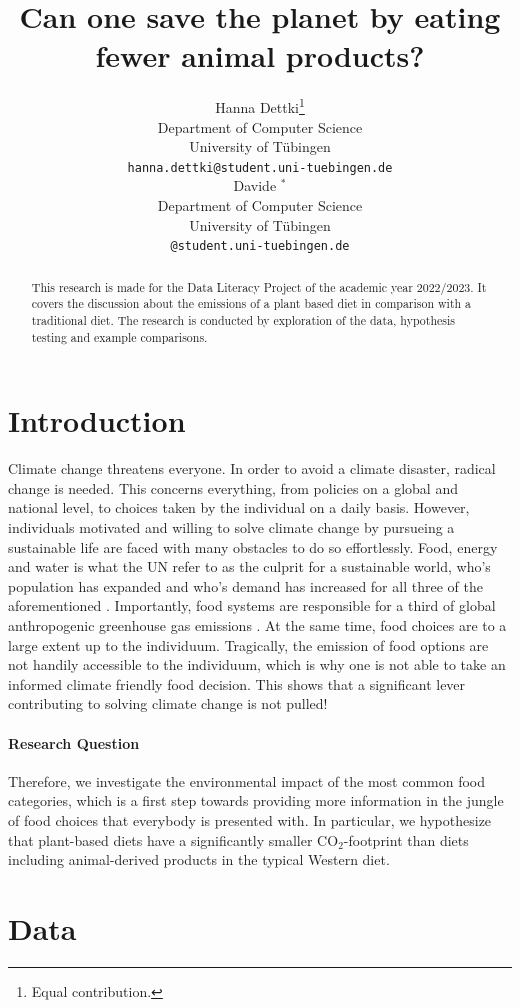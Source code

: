 \documentclass{article}
\title{Can one save the planet by eating fewer animal products?}
\author{%
  Hanna Dettki\thanks{Equal contribution.} \\
  Department of Computer Science\\
  University of Tübingen\\
  \texttt{hanna.dettki@student.uni-tuebingen.de} \\
  \And
  Davide $^{*}$  \\
  Department of Computer Science\\
  University of Tübingen\\
  \texttt{@student.uni-tuebingen.de} \\
}
\begin{document}
\maketitle

\begin{abstract}
  This research is made for the Data Literacy Project of the academic year 2022/2023. It covers the discussion about the emissions of a plant based diet in comparison with a traditional diet. The research is conducted by exploration of the data, hypothesis testing and example comparisons. 
\end{abstract}

\section{Introduction}

Climate change threatens everyone. In order to avoid a climate disaster, radical change is needed. This concerns everything, from policies on a global and national level, to choices taken by the individual on a daily basis. 
However, individuals motivated and willing to solve climate change by pursueing a sustainable life are faced with many obstacles to do so effortlessly. Food, energy and water is what the UN refer to as the culprit for a sustainable world, who's population has expanded and who's demand has increased for  all three of the aforementioned  \cite{Ritchie2020}.
 Importantly, food systems are responsible for a third of global anthropogenic greenhouse gas emissions \cite{Crippa2021}. At the same time, food choices are to a large extent up to the individuum.  Tragically,  the emission of food options are not handily accessible to the individuum, which is why one is not able to take an informed climate friendly food decision. This shows that a significant lever contributing to solving climate change is not pulled!
\paragraph*{Research Question}
Therefore, we investigate the environmental impact of the most common food categories, which is a first step towards  providing more information in the jungle of food choices that everybody is presented with. In particular, we hypothesize that  plant-based diets  have a significantly smaller CO$_2$-footprint than  diets including animal-derived products in the typical Western diet.

\section{Data}
\label{data}
\end{document}
